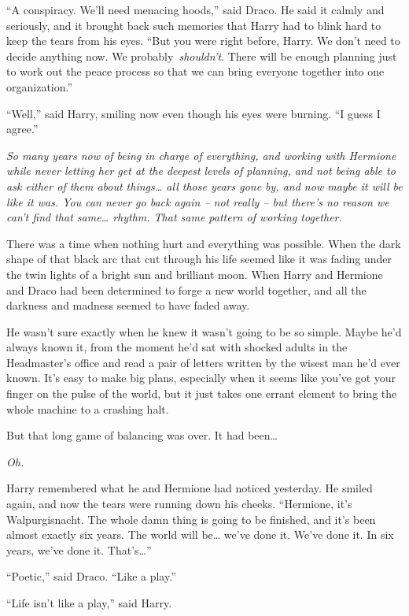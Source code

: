 ``A conspiracy. We'll need menacing hoods,'' said Draco. He said it
calmly and seriously, and it brought back such memories that Harry had
to blink hard to keep the tears from his eyes. ``But you were right
before, Harry. We don't need to decide anything now. We
probably~\emph{shouldn't}. There will be enough planning just to work
out the peace process so that we can bring everyone together into one
organization.''

``Well,'' said Harry, smiling now even though his eyes were burning. ``I
guess I agree.''

\emph{So many years now of being in charge of everything, and working
with Hermione while never letting her get at the deepest levels of
planning, and not being able to ask either of them about things\ldots{}
all those years gone by, and now maybe it will be like it was. You can
never go back again -- not really -- but there's no reason we can't find
that same\ldots{} rhythm. That same pattern of working together.}

There was a time when nothing hurt and everything was possible. When the
dark shape of that black arc that cut through his life seemed like it
was fading under the twin lights of a bright sun and brilliant moon.
When Harry and Hermione and Draco had been determined to forge a new
world together, and all the darkness and madness seemed to have faded
away.

He wasn't sure exactly when he knew it wasn't going to be so simple.
Maybe he'd always known it, from the moment he'd sat with shocked adults
in the Headmaster's office and read a pair of letters written by the
wisest man he'd ever known. It's easy to make big plans, especially when
it seems like you've got your finger on the pulse of the world, but it
just takes one errant element to bring the whole machine to a crashing
halt.

But that long game of balancing was over. It had been\ldots{}

\emph{Oh.}

Harry remembered what he and Hermione had noticed yesterday. He smiled
again, and now the tears were running down his cheeks. ``Hermione, it's
Walpurgisnacht. The whole damn thing is going to be finished, and it's
been almost exactly six years. The world will be\ldots{} we've done it.
We've done it. In six years, we've done it. That's\ldots{}''

``Poetic,'' said Draco. ``Like a play.''

``Life isn't like a play,'' said Harry.


